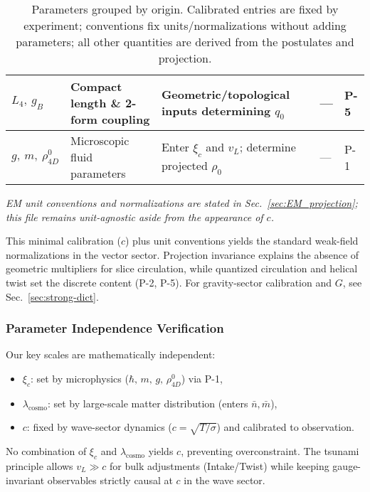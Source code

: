 \begin{table}[H]
\begin{tabularx}{\linewidth}{|p{1.7cm}|p{3.2cm}|X|p{2.4cm}|p{2.1cm}|}
\hline
$L_4,\ g_B$ & Compact length \& 2-form coupling & Geometric/topological inputs determining $q_0$ & --- & P-5 \\
\hline
$g,\ m,\ \rho_{4D}^0$ & Microscopic fluid parameters & Enter $\xi_c$ and $v_L$; determine projected $\rho_0$ & --- & P-1 \\
\hline
\end{tabularx}
\caption{Parameters grouped by origin. Calibrated entries are fixed by experiment; conventions fix units/normalizations without adding parameters; all other quantities are derived from the postulates and projection.}
\label{tab:parameters}
\end{table}

\emph{EM unit conventions and normalizations are stated in Sec.~\ref{sec:EM_projection}; this file remains unit-agnostic aside from the appearance of $c$.}

This minimal calibration ($c$) plus unit conventions yields the standard weak-field normalizations in the vector sector. Projection invariance explains the absence of geometric multipliers for slice circulation, while quantized circulation and helical twist set the discrete content (P-2, P-5). For gravity-sector calibration and $G$, see Sec.~\ref{sec:strong-dict}.

\subsubsection{Parameter Independence Verification}

Our key scales are mathematically independent:
\begin{itemize}
\item $\xi_c$: set by microphysics ($\hbar,\,m,\,g,\,\rho_{4D}^0$) via P-1,
\item $\lambda_{\text{cosmo}}$: set by large-scale matter distribution (enters $\bar n,\bar m$),
\item $c$: fixed by wave-sector dynamics ($c=\sqrt{T/\sigma}$) and calibrated to observation.
\end{itemize}
No combination of $\xi_c$ and $\lambda_{\text{cosmo}}$ yields $c$, preventing overconstraint. The tsunami principle allows $v_L\gg c$ for bulk adjustments (Intake/Twist) while keeping gauge-invariant observables strictly causal at $c$ in the wave sector.

